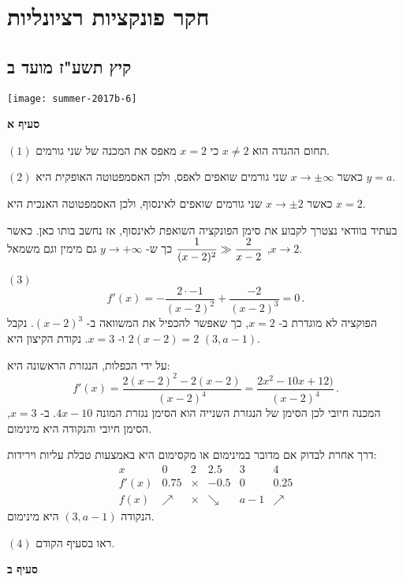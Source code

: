 


\chapter{חקר פונקציות רציונליות}

\section{קיץ תשע"ז מועד ב}

\begin{center}
\texttt{[image: summer-2017b-6]}
\end{center}

\textbf{סעיף א}

$(1)$
תחום ההגדה הוא
$x\neq 2$
כי
$x=2$
מאפס את המכנה של שני גורמים.

$(2)$
כאשר 
$x\rightarrow \pm\infty$
שני גורמים שואפים לאפס, ולכן האסמפטוטה האופקית היא
$y=a$.

כאשר 
$x\rightarrow \pm 2$
שני גורמים שואפים לאינסוף, ולכן האסמפטוטה האנכית היא
$x=2$.

בעתיד בוודאי נצטרך לקבוע את סימן הפונקציה השואפת לאינסוף, אז נחשב בותו כאן. כאשר
$x\rightarrow 2$,
$\displaystyle\frac{1}{(x-2)^2}\gg\displaystyle\frac{2}{x-2}$
כך ש-%
$y\rightarrow+\infty$
גם מימין וגם משמאל.

$(3)$
\[
f'(x) = -\frac{2\cdot -1}{(x-2)^2} + \frac{-2}{(x-2)^3}=0\,.
\]
הפוקציה לא מוגדרת ב-%
$x=2$,
כך שאפשר להכפיל את המשוואה ב-%
$(x-2)^3$.
נקבל
$2(x-2)=2$
ו-%
$x=3$.
נקודת הקיצון היא
$(3,a-1)$.

על ידי הכפלות, הנגזרת הראשונה היא:
\[
f'(x) = \frac{2(x-2)^2-2(x-2)}{(x-2)^4}=\frac{2x^2-10x+12)}{(x-2)^4}\,.
\]
המכנה חיובי לכן הסימן של הנגזרת השנייה הוא הסימן נגזרת המונה
$4x-10$.
ב-%
$x=3$,
הסימן חיובי והנקודה היא מינימום.

דרך אחרת לבדוק אם מדובר במינימום או מקסימום היא באמצעות טבלת עליות וירידות:
\[
\begin{array}{c|c|c|c|c|c}
x & 0 & 2 & 2.5 & 3 & 4\\\hline
f'(x) & 0.75 & \times & -0.5& 0 & 0.25\\\hline
f(x) & \nearrow & \times & \searrow & a-1 & \nearrow
\end{array}
\]
הנקודה
$(3,a-1)$
היא מינימום.

$(4)$
ראו בסעיף הקודם.

\textbf{סעיף ב}

